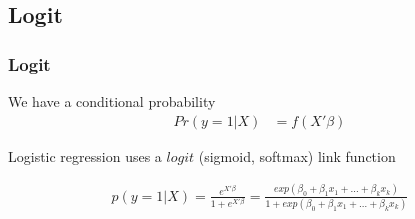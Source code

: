 \documentclass[
  shownotes,
  xcolor={svgnames},
  hyperref={colorlinks,citecolor=DarkBlue,linkcolor=DarkRed,urlcolor=DarkBlue}
  , aspectratio=169]{beamer}
\begin{document}
\subsection{Logit}
\begin{frame}[fragile]
\frametitle{Logit}
We have a conditional probability
\begin{align}
Pr(y=1|X) &= f(X'\beta) 
\end{align}

Logistic regression uses a $logit$ (sigmoid, softmax) link function

\begin{align}
p(y=1|X)=\frac{e^{X'\beta}}{1+e^{X'\beta}}=\frac{exp(\beta_0 +\beta_1 x_1 + \dots +\beta_k x_k)}{1+exp(\beta_0 +\beta_1 x_1 + \dots +\beta_k x_k)}
\end{align}

\end{frame}
\end{document}
